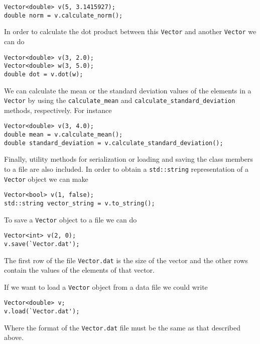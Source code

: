 \begin{lstlisting}
Vector<double> v(5, 3.1415927);
double norm = v.calculate_norm();
\end{lstlisting}

In order to calculate the dot product between this \lstinline"Vector" and another \lstinline"Vector" we can do

\begin{lstlisting}
Vector<double> v(3, 2.0);
Vector<double> w(3, 5.0);
double dot = v.dot(w);
\end{lstlisting}

We can calculate the mean or the standard deviation values of the elements in a \lstinline"Vector" by using the \lstinline"calculate_mean" and \lstinline"calculate_standard_deviation" methods, respectively. For instance

\begin{lstlisting}
Vector<double> v(3, 4.0);
double mean = v.calculate_mean();
double standard_deviation = v.calculate_standard_deviation();
\end{lstlisting}


Finally, utility methods for serialization or loading and saving the class members to a file are also included. 
In order to obtain a \lstinline"std::string" representation of a \lstinline"Vector" object we can make
 
\begin{lstlisting}
Vector<bool> v(1, false);
std::string vector_string = v.to_string();
\end{lstlisting}

To save a \lstinline"Vector" object to a file we can do

\begin{lstlisting}
Vector<int> v(2, 0);
v.save(`Vector.dat');
\end{lstlisting}

The first row of the file \lstinline"Vector.dat" is the size of the vector and the other rows contain the values of the elements of that vector. 

If we want to load a \lstinline"Vector" object from a data file we could write

\begin{lstlisting}
Vector<double> v;
v.load(`Vector.dat');
\end{lstlisting}

Where the format of the \lstinline"Vector.dat" file must be the same as that described above. 


